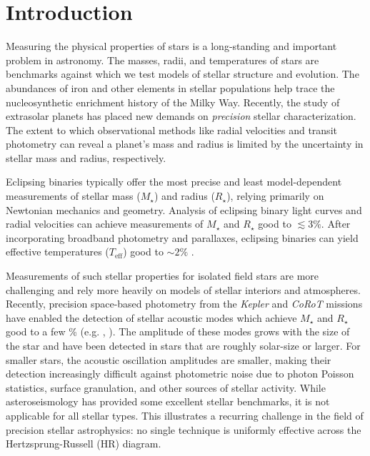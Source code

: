 \documentclass[preprint2]{aastex6}
\newcommand{\Mstar}{\ensuremath{M_{\star}}\xspace}
\newcommand{\Rstar}{\ensuremath{R_{\star}}\xspace}
\newcommand{\teff}{\ensuremath{T_{\mathrm{eff}}}\xspace}
\begin{document}
\section{Introduction}
Measuring the physical properties of stars is a long-standing and important problem in astronomy. The masses, radii, and temperatures of stars are benchmarks against which we test models of stellar structure and evolution. The abundances of iron and other elements in stellar populations help trace the nucleosynthetic enrichment history of the Milky Way. Recently, the study of extrasolar planets has placed new demands on {\em precision} stellar characterization. The extent to which observational methods like radial velocities and transit photometry can reveal a planet's mass and radius is limited by the uncertainty in stellar mass and radius, respectively.

Eclipsing binaries typically offer the most precise and least model-dependent measurements of stellar mass (\Mstar) and radius (\Rstar), relying primarily on Newtonian mechanics and geometry. Analysis of eclipsing binary light curves and radial velocities can achieve measurements of \Mstar and \Rstar good to $\lesssim3\%$. After incorporating broadband photometry and parallaxes, eclipsing binaries can yield effective temperatures (\teff) good to $\sim2\%$ \citep{Torres10}.

Measurements of such stellar properties for isolated field stars are more challenging and rely more heavily on models of stellar interiors and atmospheres. Recently, precision space-based photometry from the {\em Kepler} and {\em CoRoT} missions \citep{Borucki10,Auvergne09} have enabled the detection of stellar acoustic modes which achieve \Mstar and \Rstar good to a few \% (e.g. \citealp{Bruntt12}, \citealp{Huber13}). The amplitude of these modes grows with the size of the star and have been detected in stars that are roughly solar-size or larger. For smaller stars, the acoustic oscillation amplitudes are smaller, making their detection increasingly difficult against photometric noise due to photon Poisson statistics, surface granulation, and other sources of stellar activity. While asteroseismology has provided some excellent stellar benchmarks, it is not applicable for all stellar types. This illustrates a recurring challenge in the field of precision stellar astrophysics: no single technique is uniformly effective across the Hertzsprung-Russell (HR) diagram. 
\end{document}
